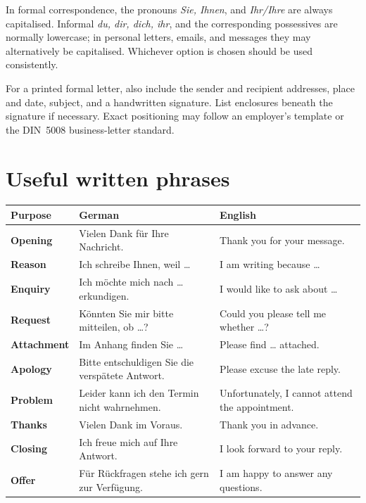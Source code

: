 In formal correspondence, the pronouns \textit{Sie, Ihnen}, and
\textit{Ihr/Ihre} are always capitalised. Informal \textit{du, dir, dich,
ihr}, and the corresponding possessives are normally lowercase; in personal
letters, emails, and messages they may alternatively be capitalised. Whichever
option is chosen should be used consistently.

For a printed formal letter, also include the sender and recipient addresses,
place and date, subject, and a handwritten signature. List enclosures beneath
the signature if necessary. Exact positioning may follow an employer's
template or the DIN~5008 business-letter standard.

\section{Useful written phrases}

\begin{center}
\small
{}
\begin{tabularx}{\textwidth}{@{}>{\bfseries}l X X@{}}
\toprule
Purpose & German & English \\
\midrule
Opening & Vielen Dank für Ihre Nachricht. & Thank you for your message. \\
Reason & Ich schreibe Ihnen, weil \ldots{} & I am writing because \ldots{} \\
Enquiry & Ich möchte mich nach \ldots{} erkundigen. & I would like to ask about \ldots{} \\
Request & Könnten Sie mir bitte mitteilen, ob \ldots{}? & Could you please tell me whether \ldots{}? \\
Attachment & Im Anhang finden Sie \ldots{} & Please find \ldots{} attached. \\
Apology & Bitte entschuldigen Sie die verspätete Antwort. & Please excuse the late reply. \\
Problem & Leider kann ich den Termin nicht wahrnehmen. & Unfortunately, I cannot attend the appointment. \\
Thanks & Vielen Dank im Voraus. & Thank you in advance. \\
Closing & Ich freue mich auf Ihre Antwort. & I look forward to your reply. \\
Offer & Für Rückfragen stehe ich gern zur Verfügung. & I am happy to answer any questions. \\
\bottomrule
\end{tabularx}
\end{center}

